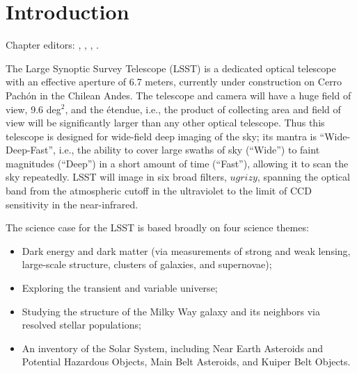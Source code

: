 \chapter[Introduction]{Introduction}
\def\chpname{intro}\label{chp:\chpname}

Chapter editors:
,
,
,
.

The Large Synoptic Survey Telescope (LSST) is a dedicated optical
telescope with an effective aperture of 6.7 meters, currently under
construction on Cerro Pach\'on in the Chilean Andes.  The telescope
and camera will have a huge field of view, 9.6 deg$^2$, and the
\'etendue, i.e., the product of collecting area and field of view will
be significantly larger than any other optical telescope.  Thus this telescope
is designed for wide-field deep imaging of the sky; its mantra is
``Wide-Deep-Fast'', i.e., the ability to cover large swaths of sky
(``Wide'') to faint magnitudes (``Deep'') in a short amount of time
(``Fast''), allowing it to scan the sky repeatedly.  LSST will image
in six broad filters, $ugrizy$, spanning the optical band from the
atmospheric cutoff in the ultraviolet to the limit of CCD sensitivity
in the near-infrared.

The science case for the LSST is based broadly on four science themes:
\begin{itemize}
\item Dark energy and dark matter (via measurements of strong and weak lensing,
  large-scale structure, clusters of galaxies, and supernovae);
\item Exploring the transient and variable universe;
\item Studying the structure of the Milky Way galaxy and its neighbors
  via resolved stellar populations;
\item An inventory of the Solar System, including Near Earth Asteroids
  and Potential Hazardous Objects, Main Belt Asteroids, and
  Kuiper Belt Objects.
\end{itemize}

